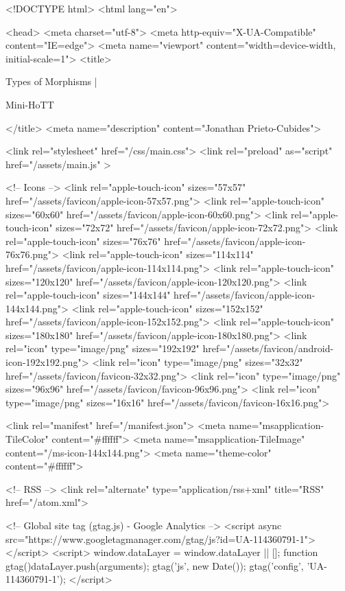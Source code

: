 <!DOCTYPE html>
<html lang="en">

<head>
  <meta charset="utf-8">
  <meta http-equiv="X-UA-Compatible" content="IE=edge">
  <meta name="viewport" content="width=device-width, initial-scale=1">
  <title>
    
      
        Types of Morphisms |
      
        Mini-HoTT
    
  </title>
  <meta name="description" content="Jonathan Prieto-Cubides">

  <link rel="stylesheet" href="/css/main.css">
  <link rel="preload" as="script" href="/assets/main.js" >

  <!-- Icons -->
  <link rel="apple-touch-icon" sizes="57x57" href="/assets/favicon/apple-icon-57x57.png">
  <link rel="apple-touch-icon" sizes="60x60" href="/assets/favicon/apple-icon-60x60.png">
  <link rel="apple-touch-icon" sizes="72x72" href="/assets/favicon/apple-icon-72x72.png">
  <link rel="apple-touch-icon" sizes="76x76" href="/assets/favicon/apple-icon-76x76.png">
  <link rel="apple-touch-icon" sizes="114x114" href="/assets/favicon/apple-icon-114x114.png">
  <link rel="apple-touch-icon" sizes="120x120" href="/assets/favicon/apple-icon-120x120.png">
  <link rel="apple-touch-icon" sizes="144x144" href="/assets/favicon/apple-icon-144x144.png">
  <link rel="apple-touch-icon" sizes="152x152" href="/assets/favicon/apple-icon-152x152.png">
  <link rel="apple-touch-icon" sizes="180x180" href="/assets/favicon/apple-icon-180x180.png">
  <link rel="icon" type="image/png" sizes="192x192"  href="/assets/favicon/android-icon-192x192.png">
  <link rel="icon" type="image/png" sizes="32x32" href="/assets/favicon/favicon-32x32.png">
  <link rel="icon" type="image/png" sizes="96x96" href="/assets/favicon/favicon-96x96.png">
  <link rel="icon" type="image/png" sizes="16x16" href="/assets/favicon/favicon-16x16.png">

  <link rel="manifest" href="/manifest.json">
  <meta name="msapplication-TileColor" content="#ffffff">
  <meta name="msapplication-TileImage" content="/ms-icon-144x144.png">
  <meta name="theme-color" content="#ffffff">

  <!-- RSS -->
  <link rel="alternate" type="application/rss+xml" title="RSS" href="/atom.xml">

  <!-- Global site tag (gtag.js) - Google Analytics -->
  <script async src="https://www.googletagmanager.com/gtag/js?id=UA-114360791-1"></script>
  <script>
    window.dataLayer = window.dataLayer || [];
    function gtag(){dataLayer.push(arguments);}
    gtag('js', new Date());
    gtag('config', 'UA-114360791-1');
  </script>

